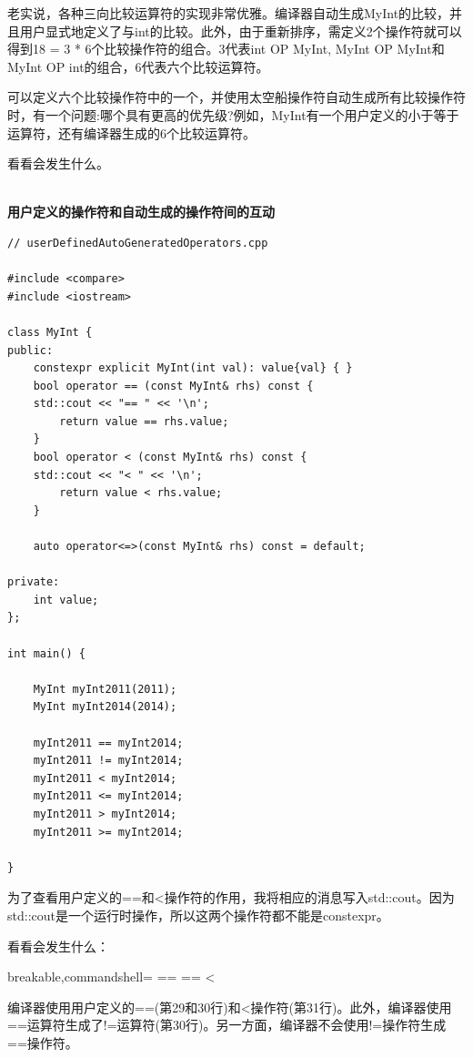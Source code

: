 老实说，各种三向比较运算符的实现非常优雅。编译器自动生成MyInt的比较，并且用户显式地定义了与int的比较。此外，由于重新排序，需定义2个操作符就可以得到18 = 3 * 6个比较操作符的组合。3代表int OP MyInt, MyInt OP MyInt和MyInt OP int的组合，6代表六个比较运算符。


可以定义六个比较操作符中的一个，并使用太空船操作符自动生成所有比较操作符时，有一个问题:哪个具有更高的优先级?例如，MyInt有一个用户定义的小于等于运算符，还有编译器生成的6个比较运算符。

看看会发生什么。

\hspace*{\fill} \\ %
\noindent
\textbf{用户定义的操作符和自动生成的操作符间的互动}
\begin{lstlisting}[style=styleCXX]
// userDefinedAutoGeneratedOperators.cpp

#include <compare>
#include <iostream>

class MyInt {
public:
	constexpr explicit MyInt(int val): value{val} { }
	bool operator == (const MyInt& rhs) const {
	std::cout << "== " << '\n';
		return value == rhs.value;
	}
	bool operator < (const MyInt& rhs) const {
	std::cout << "< " << '\n';
		return value < rhs.value;
	}
	
	auto operator<=>(const MyInt& rhs) const = default;

private:
	int value;
};

int main() {

	MyInt myInt2011(2011);
	MyInt myInt2014(2014);
	
	myInt2011 == myInt2014;
	myInt2011 != myInt2014;
	myInt2011 < myInt2014;
	myInt2011 <= myInt2014;
	myInt2011 > myInt2014;
	myInt2011 >= myInt2014;

}
\end{lstlisting}

为了查看用户定义的==和<操作符的作用，我将相应的消息写入std::cout。因为std::cout是一个运行时操作，所以这两个操作符都不能是constexpr。

看看会发生什么：

\begin{tcblisting}{breakable,commandshell={}}
==
==
<
\end{tcblisting}

编译器使用用户定义的==(第29和30行)和<操作符(第31行)。此外，编译器使用==运算符生成了!=运算符(第30行)。另一方面，编译器不会使用!=操作符生成==操作符。

